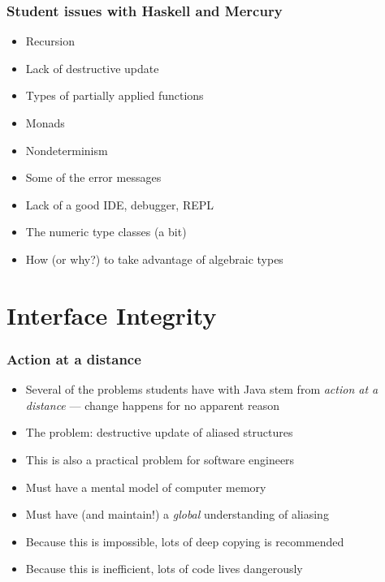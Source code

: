 \documentclass[12pt]{beamer}
\begin{document}
\begin{frame}[fragile]
\frametitle{Student issues with Haskell and Mercury}
\begin{itemize}
\item Recursion
\item Lack of destructive update
\item Types of partially applied functions
\item Monads
\item Nondeterminism
\item Some of the error messages
\item Lack of a good IDE, debugger, REPL
\item The numeric type classes (a bit)
\item How (or why?) to take advantage of algebraic types
\end{itemize}

\end{frame}


\section{Interface Integrity}

\begin{frame}[fragile]
\frametitle{Action at a distance}
\begin{itemize}
\item Several of the problems students have with Java stem from
  \emph{action at a distance} --- change happens for no apparent reason
\item The problem:  destructive update of aliased structures
\item This is also a practical problem for software engineers
\item Must have a mental model of computer memory
\item Must have (and maintain!) a \emph{global} understanding of aliasing
\item Because this is impossible, lots of deep copying is recommended
\item Because this is inefficient, lots of code lives dangerously

\end{itemize}

\end{frame}
\end{document}
